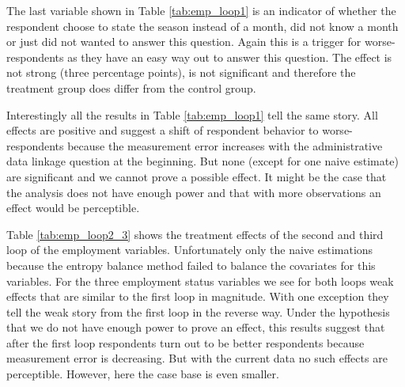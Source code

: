 The last variable shown in Table \ref{tab:emp_loop1} is an indicator of whether the respondent choose to state the season instead of a month, did not know a month or just did not wanted to answer this question. Again this is a trigger for worse-respondents as they have an easy way out to answer this question. The effect is not strong (three percentage points), is not significant and therefore the treatment group does differ from the control group. 

Interestingly all the results in Table \ref{tab:emp_loop1} tell the same story. All effects are positive and suggest a shift of respondent behavior to worse-respondents because the measurement error increases with the administrative data linkage question at the beginning. But none (except for one naive estimate) are significant and we cannot prove a possible effect. It might be the case that the analysis does not have enough power and that with more observations an effect would be perceptible. 

Table \ref{tab:emp_loop2_3} shows the treatment effects of the second and third loop of the employment variables. Unfortunately only the naive estimations because the entropy balance method failed to balance the covariates for this variables. For the three employment status variables we see for both loops weak effects that are similar to the first loop in magnitude. With one exception they tell the weak story from the first loop in the reverse way. Under the hypothesis that we do not have enough power to prove an effect, this results suggest that after the first loop respondents turn out to be better respondents because measurement error is decreasing. But with the current data no such effects are perceptible. However, here the case base is even smaller. 

